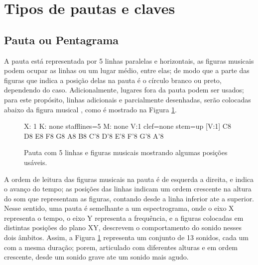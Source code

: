 \section{Tipos de pautas e claves}
\label{sec:tipospauta}

\subsection{Pauta ou Pentagrama}
\label{sec:pauta}
A pauta está representada por 5 linhas paralelas e horizontais, 
as figuras musicais podem ocupar as linhas ou um lugar médio, entre elas;
de modo que a parte das figuras que indica a posição delas na pauta é o círculo branco ou preto, dependendo do caso.
Adicionalmente, lugares fora da pauta podem ser usados; 
para este propósito, linhas adicionais e parcialmente desenhadas, 
serão colocadas abaixo da figura musical \cite[pp. 10]{cardoso1973curso},
como é mostrado na Figura \ref{fig:abc-pauta5}.
\begin{figure}[H]
\centering
\begin{abc}[name=abc-pauta5]
%
X: 1 %
K: none stafflines=5 %
M: none %
V:1 clef=none stem=up %
%
[V:1] C8 D8 E8 F8 G8 A8 B8 C'8 D'8 E'8 F'8 G'8 A'8
\end{abc}
\caption{Pauta com 5 linhas e figuras musicais mostrando algumas posições usáveis.}
\label{fig:abc-pauta5}
\end{figure}
A ordem de leitura das figuras musicais na pauta é de esquerda a direita,
e indica o avanço  do tempo;
as posições das linhas indicam um ordem crescente na altura do som que representam as figuras,
contando desde a linha inferior ate a superior. Nesse sentido, 
uma pauta é semelhante a um espectrograma, onde o eixo X representa o tempo,
o eixo Y representa a frequência, e a figuras colocadas em distintas posições do plano XY, descrevem
o comportamento do sonido nesses dois âmbitos. Assim, a Figura \ref{fig:abc-pauta5}
representa um conjunto de 13 sonidos, cada um com a mesma duração; 
porem, articulado com diferentes alturas e em ordem crescente, 
desde um sonido grave ate um sonido mais agudo.


